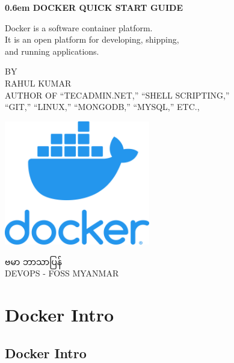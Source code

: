 \documentclass{article}
\begin{document}

\clearpage
\newcommand\nbvspace[1][3]{\vspace*{\stretch{#1}}}
\newcommand\nbstretchyspace{\spaceskip0.5em plus 0.25em minus 0.25em}
\newcommand{\nbtitlestretch}{\spaceskip0.6em}
\pagestyle{empty}
\begin{center}
\bfseries
\nbvspace[1]
\Huge
{\nbtitlestretch\huge
DOCKER QUICK START GUIDE}

\nbvspace[1]
\normalsize

Docker is a software container platform. \\
It is an open platform for developing, shipping, \\
and running applications. 
\nbvspace[1]

\small BY\\
\Large RAHUL KUMAR\\[0.5em]
\footnotesize AUTHOR OF ``TECADMIN.NET,'' ``SHELL SCRIPTING,'' \\
``GIT,'' ``LINUX,'' ``MONGODB,'' ``MYSQL,'' ETC.,

\nbvspace[2]

\includegraphics[width=2.5in]{./docker.png}
\nbvspace[3]
\normalsize

ဗမာ ဘာသာပြန်\\
\large
DEVOPS - FOSS MYANMAR
\nbvspace[1]
\end{center}


\pagebreak

\section{Docker Intro}\label{docker-intro}

\subsection{Docker Intro}\label{docker-intro}
\end{document}
